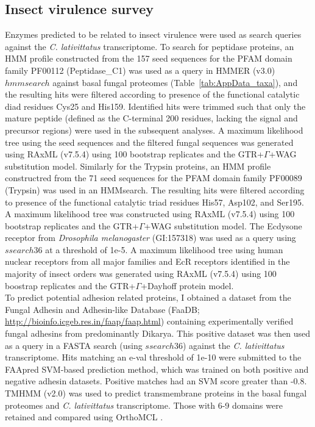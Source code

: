 \subsection*{Insect virulence survey}
Enzymes predicted to be related to insect virulence were used as search queries against the \textit{C. lativittatus} transcriptome. To search for peptidase proteins, an HMM profile constructed from the 157 seed sequences for the PFAM domain family PF00112 (Peptidase\_C1) was used as a query in HMMER (v3.0) $hmmsearch$ against basal fungal proteomes (Table~\ref{tab:AppData_taxa}), and the resulting hits were filtered according to presence of the functional catalytic diad residues Cys25 and His159. Identified hits were trimmed such that only the mature peptide (defined as the C-terminal 200 residues, lacking the signal and precursor regions) were used in the subsequent analyses. A maximum likelihood tree using the seed sequences and the filtered fungal sequences was generated using RAxML (v7.5.4) using 100 bootstrap replicates and the GTR+$\Gamma$+WAG substitution model. Similarly for the Trypsin proteins, an HMM profile constructred from the 71 seed sequences for the PFAM domain family PF00089 (Trypsin) was used in an HMMsearch. The resulting hits were filtered according to presence of the functional catalytic triad residues His57, Asp102, and Ser195. A maximum likelihood tree was constructed using RAxML (v7.5.4) using 100 bootstrap replicates and the GTR+$\Gamma$+WAG substitution model. The Ecdysone receptor from \textit{Drosophila melanogaster} (GI:157318) was used as a query using $ssearch36$ at a threshold of 1e-5. A maximum likelihood tree using human nuclear receptors from all major families and EcR receptors identified in the majority of insect orders was generated using RAxML (v7.5.4) \cite{Stamatakis2014} using 100 boostrap replicates and the GTR+$\Gamma$+Dayhoff protein model.\\
\indent To predict potential adhesion related proteins, I obtained a dataset from the Fungal Adhesin and Adhesin-like Database (FaaDB; \url{http://bioinfo.icgeb.res.in/faap/faap.html}) containing experimentally verified fungal adhesins from predominantly Dikarya. This positive dataset was then used as a query in a FASTA search (using $ssearch36$) against the \textit{C. lativittatus} transcriptome. Hits matching an e-val threshold of 1e-10 were submitted to the FAApred SVM-based prediction method, which was trained on both positive and negative adhesin datasets. Positive matches had an SVM score greater than -0.8.\\
\indent TMHMM (v2.0) \cite{Krogh2001} was used to predict transmembrane proteins in the basal fungal proteomes and \textit{C. lativittatus} transcriptome. Those with 6-9 domains were retained and compared using OrthoMCL \cite{Li2003}. \\

